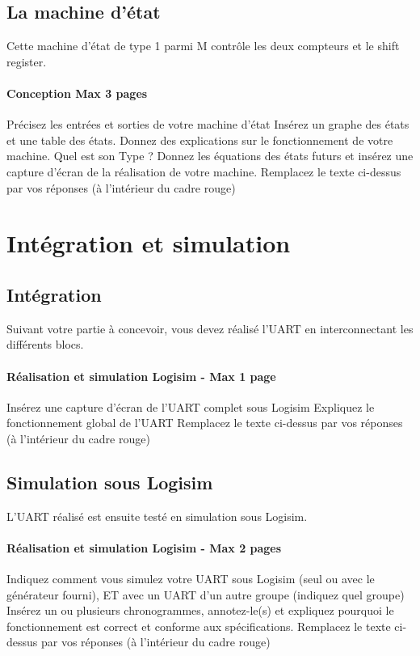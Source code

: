 \documentclass[a4paper]{article} %
\begin{document}
\subsection{La machine d’état}
Cette machine d’état de type 1 parmi M contrôle les deux compteurs et le shift register. 
\begin{tcolorbox}[colframe=Monokaimagenta,colback=white, breakable, enhanced]
\paragraph{Conception Max 3 pages}
Précisez les entrées et sorties de votre machine d’état
Insérez un graphe des états et une table des états. Donnez des explications sur le fonctionnement de votre machine. Quel est son Type ?
Donnez les équations des états futurs et insérez une capture d’écran de la réalisation de votre machine.
Remplacez le texte ci-dessus par vos réponses (à l’intérieur du cadre rouge)
\\
\end{tcolorbox}
\section {Intégration et simulation}
\subsection{Intégration}
Suivant votre partie à concevoir, vous devez réalisé l’UART en interconnectant les différents blocs. 
\begin{tcolorbox}[colframe=Monokaimagenta,colback=white, breakable, enhanced]
\paragraph{Réalisation et simulation Logisim - Max 1 page}
Insérez une capture d’écran de l’UART complet sous Logisim
Expliquez le fonctionnement global de l’UART
Remplacez le texte ci-dessus par vos réponses (à l’intérieur du cadre rouge)
\\
\end{tcolorbox}
 \subsection{Simulation sous Logisim}
L’UART réalisé est ensuite testé en simulation sous Logisim.
\begin{tcolorbox}[colframe=Monokaimagenta,colback=white, breakable, enhanced]
\paragraph{Réalisation et simulation Logisim - Max 2 pages}
Indiquez comment vous simulez votre UART sous Logisim (seul ou avec le générateur fourni), ET avec un UART d’un autre groupe (indiquez quel groupe)
Insérez un ou plusieurs chronogrammes, annotez-le(s) et expliquez pourquoi le fonctionnement est correct et conforme aux spécifications.
Remplacez le texte ci-dessus par vos réponses (à l’intérieur du cadre rouge)
\\
\end{tcolorbox}
\end{document}
